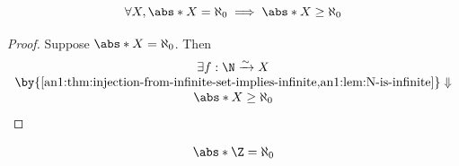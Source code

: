 \begin{theorem} \label{an1:thm:countable-set-is-infinite}
  \[
    \forall X, \abs*{X} = \aleph_{0} \implies \abs*{X} \geq \aleph_{0}
  \]
\end{theorem}

\begin{proof}
  Suppose $\abs*{X} = \aleph_{0}$. Then
  \[
    \begin{array}{c}
      \exists f: \N \xrightarrow{\sim} X                                                                \\
      \by{\Cref{an1:thm:injection-from-infinite-set-implies-infinite,an1:lem:N-is-infinite}} \Downarrow \\
      \abs*{X} \geq \aleph_{0}
    \end{array}
  \]
\end{proof}

\begin{theorem} \label{an1:thm:Z-is-countable}
  \[
    \abs*{\Z} = \aleph_{0}
  \]
\end{theorem}

